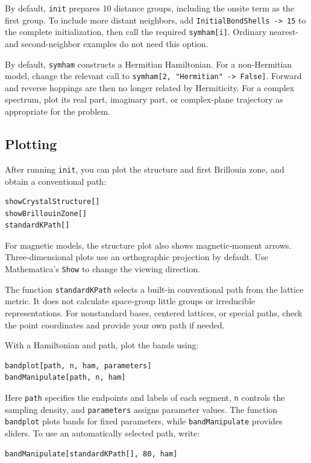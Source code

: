\documentclass[titlepage,a4paper,12pt]{article}
\begin{document}
By default, \lstinline|init| prepares 10 distance groups, including the onsite
term as the first group. To include more distant neighbors, add
\lstinline|InitialBondShells -> 15| to the complete initialization, then call
the required \lstinline|symham[i]|. Ordinary nearest- and second-neighbor
examples do not need this option.

By default, \lstinline|symham| constructs a Hermitian Hamiltonian.
For a non-Hermitian model, change the relevant call to
\lstinline|symham[2, "Hermitian" -> False]|.
Forward and reverse hoppings are then no longer related by Hermiticity.
For a complex spectrum, plot its real part, imaginary part, or complex-plane
trajectory as appropriate for the problem.

\subsection{Plotting}
After running \lstinline|init|, you can plot the structure and first Brillouin
zone, and obtain a conventional path:
\begin{lstlisting}[numbers=none]
showCrystalStructure[]
showBrillouinZone[]
standardKPath[]
\end{lstlisting}
For magnetic models, the structure plot also shows magnetic-moment arrows.
Three-dimensional plots use an orthographic projection by default.
Use Mathematica's \lstinline|Show| to change the viewing direction.

The function \lstinline|standardKPath| selects a built-in conventional path
from the lattice metric. It does not calculate space-group little groups or
irreducible representations. For nonstandard bases, centered lattices, or
special paths, check the point coordinates and provide your own path if needed.

With a Hamiltonian and path, plot the bands using:
\begin{lstlisting}[numbers=none]
bandplot[path, n, ham, parameters]
bandManipulate[path, n, ham]
\end{lstlisting}
Here \lstinline|path| specifies the endpoints and labels of each segment,
\lstinline|n| controls the sampling density, and \lstinline|parameters|
assigns parameter values. The function \lstinline|bandplot| plots bands for
fixed parameters, while \lstinline|bandManipulate| provides sliders.
To use an automatically selected path, write:
\begin{lstlisting}[numbers=none]
bandManipulate[standardKPath[], 80, ham]
\end{lstlisting}
\end{document}
